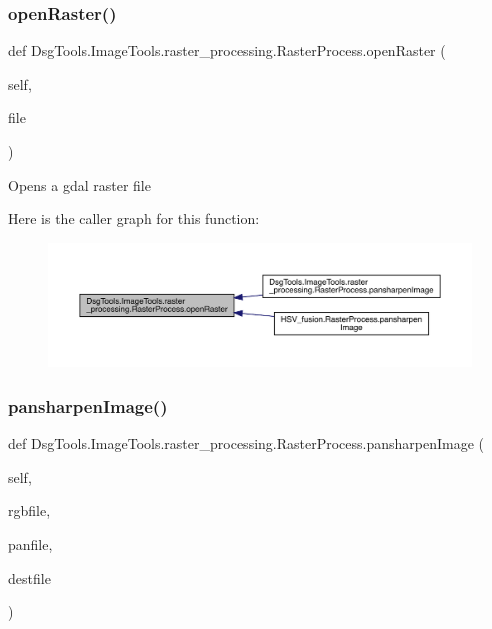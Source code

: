 \subsubsection{\texorpdfstring{open\+Raster()}{openRaster()}}
{\footnotesize\ttfamily def Dsg\+Tools.\+Image\+Tools.\+raster\+\_\+processing.\+Raster\+Process.\+open\+Raster (\begin{DoxyParamCaption}\item[{}]{self,  }\item[{}]{file }\end{DoxyParamCaption})}

\begin{DoxyVerb}Opens a gdal raster file
\end{DoxyVerb}
 Here is the caller graph for this function\+:
\nopagebreak
\begin{figure}[H]
\begin{center}
\leavevmode
\includegraphics[width=350pt]{class_dsg_tools_1_1_image_tools_1_1raster__processing_1_1_raster_process_a9efca9cef0b40ad8ca0e4e0b949efc8d_icgraph}
\end{center}
\end{figure}
\mbox{\label{class_dsg_tools_1_1_image_tools_1_1raster__processing_1_1_raster_process_ab97bd21a7e0e90893917b02be37d8001}} 
\subsubsection{\texorpdfstring{pansharpen\+Image()}{pansharpenImage()}}
{\footnotesize\ttfamily def Dsg\+Tools.\+Image\+Tools.\+raster\+\_\+processing.\+Raster\+Process.\+pansharpen\+Image (\begin{DoxyParamCaption}\item[{}]{self,  }\item[{}]{rgbfile,  }\item[{}]{panfile,  }\item[{}]{destfile }\end{DoxyParamCaption})}

